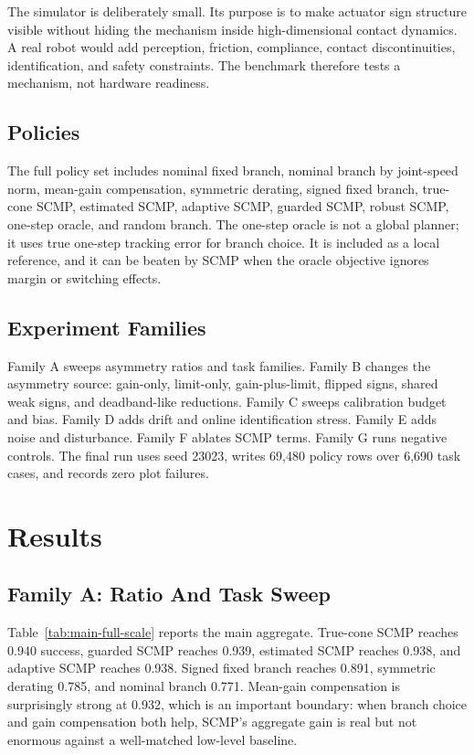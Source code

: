 \documentclass{article}
\begin{document}
The simulator is deliberately small. Its purpose is to make actuator sign structure visible without hiding the mechanism inside high-dimensional contact dynamics. A real robot would add perception, friction, compliance, contact discontinuities, identification, and safety constraints. The benchmark therefore tests a mechanism, not hardware readiness.

\subsection{Policies}

The full policy set includes nominal fixed branch, nominal branch by joint-speed norm, mean-gain compensation, symmetric derating, signed fixed branch, true-cone SCMP, estimated SCMP, adaptive SCMP, guarded SCMP, robust SCMP, one-step oracle, and random branch. The one-step oracle is not a global planner; it uses true one-step tracking error for branch choice. It is included as a local reference, and it can be beaten by SCMP when the oracle objective ignores margin or switching effects.

\subsection{Experiment Families}

Family A sweeps asymmetry ratios and task families. Family B changes the asymmetry source: gain-only, limit-only, gain-plus-limit, flipped signs, shared weak signs, and deadband-like reductions. Family C sweeps calibration budget and bias. Family D adds drift and online identification stress. Family E adds noise and disturbance. Family F ablates SCMP terms. Family G runs negative controls. The final run uses seed 23023, writes 69,480 policy rows over 6,690 task cases, and records zero plot failures.

\section{Results}

\subsection{Family A: Ratio And Task Sweep}

Table~\ref{tab:main-full-scale} reports the main aggregate. True-cone SCMP reaches 0.940 success, guarded SCMP reaches 0.939, estimated SCMP reaches 0.938, and adaptive SCMP reaches 0.938. Signed fixed branch reaches 0.891, symmetric derating 0.785, and nominal branch 0.771. Mean-gain compensation is surprisingly strong at 0.932, which is an important boundary: when branch choice and gain compensation both help, SCMP's aggregate gain is real but not enormous against a well-matched low-level baseline.
\end{document}
